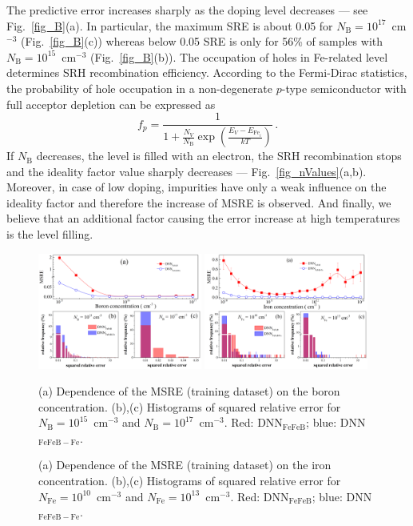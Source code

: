 \documentclass[num-refs]{wiley-article} %
\begin{document}
The predictive error increases sharply as the doping level decreases --- see Fig.~\ref{fig_B}(a).
In particular,  the maximum SRE is about 0.05 for $N_\mathrm{B}=10^{17}$~cm$^{-3}$ (Fig.~\ref{fig_B}(c))
whereas below 0.05 SRE is only for 56\% of samples with $N_\mathrm{B}=10^{15}$~cm$^{-3}$ (Fig.~\ref{fig_B}(b)).
The occupation of holes in Fe-related level determines SRH recombination efficiency.
According to the Fermi-Dirac statistics,
the probability of hole occupation in a non-degenerate $p$-type semiconductor with full acceptor depletion can be expressed as
\begin{equation}
\label{eqfp}
 f_p=\frac{1}{1+\frac{N_V}{N_\mathrm{B}}\exp\left(\frac{E_V-E_{\mathrm{Fe}_i}}{kT}\right)}\,.
\end{equation}
If $N_\mathrm{B}$ decreases, the level is filled with an electron,
the SRH recombination stops
and the ideality factor value sharply decreases  --- Fig.~\ref{fig_nValues}(a,b).
Moreover, in case of low doping,   impurities have only a weak influence
on the ideality factor and therefore the increase of MSRE is observed.
And finally, we believe that an additional factor causing the error increase
at high temperatures is the level filling.


\begin{figure}[tb]
\centering
\includegraphics[width=0.48\textwidth]{F6} \hfill
\includegraphics[width=0.48\textwidth]{F7} \\
\parbox[t]{0.48\textwidth}
{\caption{(a) Dependence of the MSRE (training dataset) on the boron concentration.
(b),(c) Histograms of squared  relative error for $N_\mathrm{B}=10^{15}$~cm$^{-3}$ and $N_\mathrm{B}=10^{17}$~cm$^{-3}$.
Red: DNN$_\mathrm{FeFeB}$; blue: DNN$_\mathrm{FeFeB-Fe}$.
}
\label{fig_B}} \hfill
\parbox[t]{0.48\textwidth}{\caption{(a) Dependence of the MSRE (training dataset) on the iron concentration.
(b),(c) Histograms of squared  relative error for $N_\mathrm{Fe}=10^{10}$~cm$^{-3}$ and $N_\mathrm{Fe}=10^{13}$~cm$^{-3}$.
Red: DNN$_\mathrm{FeFeB}$; blue: DNN$_\mathrm{FeFeB-Fe}$.}
\label{fig_Fe}}
\end{figure}
\end{document}

